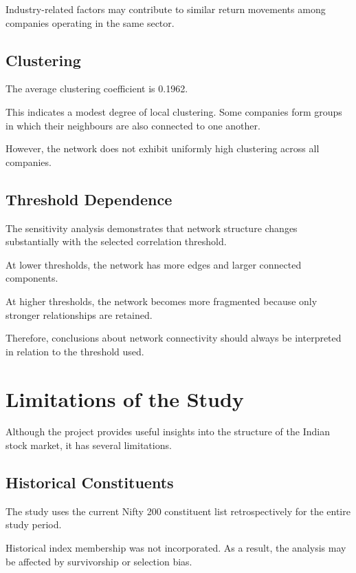 \documentclass[11pt,a4paper]{article}
\begin{document}
Industry-related factors may contribute to
similar return movements among companies operating
in the same sector.

\subsection{Clustering}

The average clustering coefficient is 0.1962.

This indicates a modest degree of local clustering.
Some companies form groups in which their neighbours
are also connected to one another.

However, the network does not exhibit uniformly
high clustering across all companies.

\subsection{Threshold Dependence}

The sensitivity analysis demonstrates that network
structure changes substantially with the selected
correlation threshold.

At lower thresholds, the network has more edges
and larger connected components.

At higher thresholds, the network becomes more
fragmented because only stronger relationships
are retained.

Therefore, conclusions about network connectivity
should always be interpreted in relation to the
threshold used.

\section{Limitations of the Study}

Although the project provides useful insights into
the structure of the Indian stock market, it has
several limitations.

\subsection{Historical Constituents}

The study uses the current Nifty 200 constituent
list retrospectively for the entire study period.

Historical index membership was not incorporated.
As a result, the analysis may be affected by
survivorship or selection bias.
\end{document}
